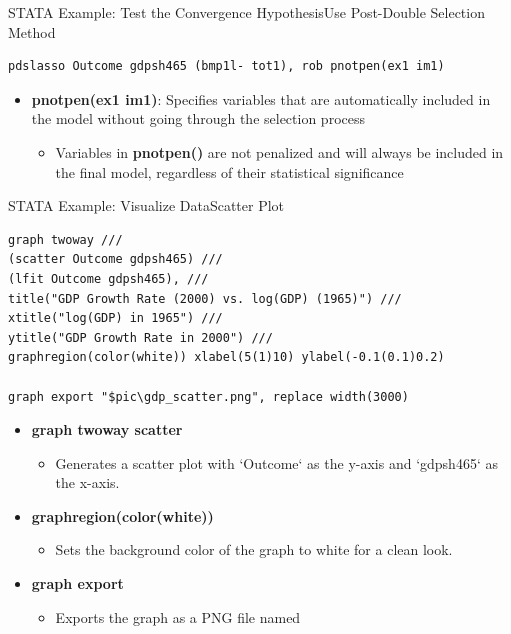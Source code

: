 \documentclass[hyperref={pdfpagelabels=false}]{beamer}
\begin{document}
\begin{frame}[fragile]{STATA Example: Test the Convergence Hypothesis}{Use Post-Double Selection Method}
\begin{lstlisting}
pdslasso Outcome gdpsh465 (bmp1l- tot1), rob pnotpen(ex1 im1)
\end{lstlisting}
	
	\begin{itemize}    
		\item \textbf{pnotpen(ex1 im1)}: Specifies variables that are automatically included in the model without going through the selection process
		\vspace{0.2cm}
			\begin{itemize}
		\item Variables in \textbf{pnotpen()} are not penalized and will always be included in the final model, regardless of their statistical significance
			\end{itemize}
	\end{itemize}
	
\end{frame}








\begin{frame}[fragile]{STATA Example: Visualize Data}{Scatter Plot}
\begin{lstlisting}
graph twoway ///
(scatter Outcome gdpsh465) ///
(lfit Outcome gdpsh465), ///
title("GDP Growth Rate (2000) vs. log(GDP) (1965)") ///
xtitle("log(GDP) in 1965") ///
ytitle("GDP Growth Rate in 2000") ///
graphregion(color(white)) xlabel(5(1)10) ylabel(-0.1(0.1)0.2)

graph export "$pic\gdp_scatter.png", replace width(3000)
\end{lstlisting}
	\begin{itemize}	
 \item \textbf{graph twoway scatter}
\begin{itemize}
	\item Generates a scatter plot with `Outcome` as the y-axis and `gdpsh465` as the x-axis.
\end{itemize}
	\vspace{0.2cm}
\item \textbf{graphregion(color(white))} 
\begin{itemize}
	\item Sets the background color of the graph to white for a clean look.
\end{itemize}
	\vspace{0.2cm}
\item \textbf{graph export} 
\begin{itemize}
	\item Exports the graph as a PNG file named
\end{itemize}
		
		
	\end{itemize}
	
\end{frame}
\end{document}
